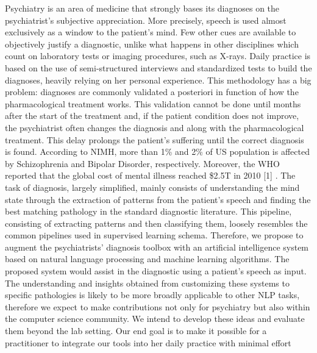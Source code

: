 Psychiatry is an area of medicine that strongly bases its diagnoses on the psychiatrist's subjective appreciation. More precisely, speech is used almost exclusively as a window to the patient's mind. Few other cues are available to objectively justify a diagnostic, unlike what happens in other disciplines which count on laboratory tests or imaging procedures, such as X-rays. Daily practice is based on the use of semi-structured interviews and standardized tests to build the diagnoses, heavily relying on her personal experience. This methodology has a big problem: diagnoses are commonly validated a posteriori in function of how the pharmacological treatment works. This validation cannot be done until months after the start of the treatment and, if the patient condition does not improve, the psychiatrist often changes the diagnosis and along with the pharmacological treatment. This delay prolongs the patient's suffering until the correct diagnosis is found. According to NIMH, more than 1\% and 2\% of US population is affected by Schizophrenia and Bipolar Disorder, respectively. Moreover, the WHO reported that the global cost of mental illness reached \$2.5T in 2010 [1] . The task of diagnosis, largely simplified, mainly consists of understanding the mind state through the extraction of patterns from the patient's speech and finding the best matching pathology in the standard diagnostic literature. This pipeline, consisting of extracting patterns and then classifying them, loosely resembles the common pipelines used in supervised learning schema. Therefore, we propose to augment the psychiatrists' diagnosis toolbox with an artificial intelligence system based on natural language processing and machine learning algorithms. The proposed system would assist in the diagnostic using a patient's speech as input. The understanding and insights obtained from customizing these systems to specific pathologies is likely to be more broadly applicable to other NLP tasks, therefore we expect to make contributions not only for psychiatry but also within the computer science community. We intend to develop these ideas and evaluate them beyond the lab setting. Our end goal is to make it possible for a practitioner to integrate our tools into her daily practice with minimal effort

